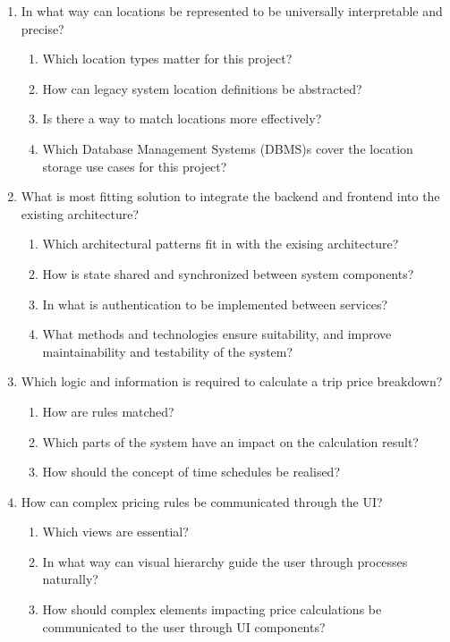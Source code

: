 \begin{enumerate}

	\item In what way can locations be represented to be universally interpretable and precise?
	      \begin{enumerate}[label*=\arabic*.]
					\item Which location types matter for this project?
					\item How can legacy system location definitions be abstracted?
					\item Is there a way to match locations more effectively?
		      \item Which Database Management Systems (DBMS)s cover the location storage use cases for this project?
	      \end{enumerate}

	\item What is most fitting solution to integrate the backend and frontend into the existing architecture?
	      \begin{enumerate}[label*=\arabic*.]
		      \item Which architectural patterns fit in with the exising architecture?
					\item How is state shared and synchronized between system components?
		      \item In what is authentication to be implemented between services?
					\item What methods and technologies ensure suitability, and improve maintainability and testability of the system?
	      \end{enumerate}

	\item Which logic and information is required to calculate a trip price breakdown?
	      \begin{enumerate}[label*=\arabic*.]
		      \item How are rules matched?
		      \item Which parts of the system have an impact on the calculation result?
		      \item How should the concept of time schedules be realised?
	      \end{enumerate}

	\item How can complex pricing rules be communicated through the UI?
	      \begin{enumerate}[label*=\arabic*.]
		      \item Which views are essential?
		      \item In what way can visual hierarchy guide the user through processes naturally?
		      \item How should complex elements impacting price calculations be communicated to the user through UI components?
	      \end{enumerate}

\end{enumerate}

